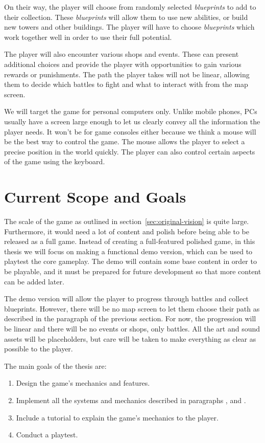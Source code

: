 On their way, the player will choose from randomly selected \emph{blueprints} to add to their collection.
These \emph{blueprints} will allow them to use new abilities, or build new towers and other buildings.
The player will have to choose \emph{blueprints} which work together well in order to use their full potential.

The player will also encounter various shops and events.
These can present additional choices and provide the player with opportunities to gain various rewards or punishments.
The path the player takes will not be linear, allowing them to decide which battles to fight and what to interact with from the map screen.

We will target the game for personal computers only.
Unlike mobile phones, PCs usually have a screen large enough to let us clearly convey all the information the player needs.
It won't be for game consoles either because we think a mouse will be the best way to control the game.
The mouse allows the player to select a precise position in the world quickly.
The player can also control certain aspects of the game using the keyboard.

\section{Current Scope and Goals}\label{sec:thesis-goals}

The scale of the game as outlined in section~\ref{sec:original-vision} is quite large.
Furthermore, it would need a lot of content and polish before being able to be released as a full game.
Instead of creating a full-featured polished game, in this thesis we will focus on making a functional demo version, which can be used to playtest the core gameplay.
The demo will contain some base content in order to be playable, and it must be prepared for future development so that more content can be added later.

The demo version will allow the player to progress through battles and collect blueprints.
However, there will be no map screen to let them choose their path as described in the paragraph  of the previous section.
For now, the progression will be linear and there will be no events or shops, only battles.
All the art and sound assets will be placeholders, but care will be taken to make everything as clear as possible to the player.

\hfill\break
The main goals of the thesis are:
\begin{enumerate}
    \item Design the game's mechanics and features.
    \item Implement all the systems and mechanics described in paragraphs ,  and .
    \item Include a tutorial to explain the game's mechanics to the player.
    \item Conduct a playtest.
\end{enumerate}
